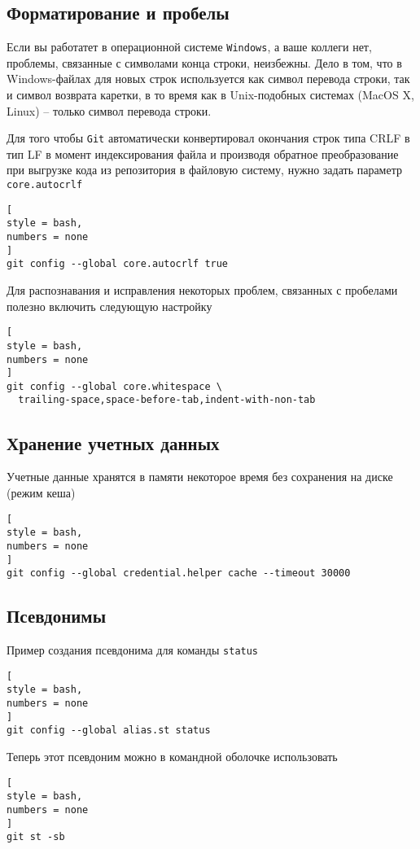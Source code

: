 \documentclass[%
	11pt,
	a4paper,
	utf8,
		]{article}
\begin{document}
\subsection{Форматирование и пробелы}

Если вы работатет в операционной системе \texttt{Windows}, а ваше коллеги нет, проблемы, связанные с символами конца строки, неизбежны. Дело в том, что в Windows-файлах для новых строк используется как символ перевода строки, так и символ возврата каретки, в то время как в Unix-подобных системах (MacOS X, Linux) -- только символ перевода строки.

Для того чтобы \texttt{Git} автоматически конвертировал окончания строк типа CRLF в тип LF в момент индексирования файла и производя обратное преобразование при выгрузке кода из репозитория в файловую систему, нужно задать параметр \texttt{core.autocrlf}
\begin{lstlisting}[
style = bash,
numbers = none
]
git config --global core.autocrlf true
\end{lstlisting}

Для распознавания и исправления некоторых проблем, связанных с пробелами полезно
включить следующую настройку
\begin{lstlisting}[
style = bash,
numbers = none
]
git config --global core.whitespace \
  trailing-space,space-before-tab,indent-with-non-tab
\end{lstlisting}


\subsection{Хранение учетных данных}

Учетные данные хранятся в памяти некоторое время без сохранения на диске (режим кеша)
\begin{lstlisting}[
style = bash,
numbers = none
]
git config --global credential.helper cache --timeout 30000
\end{lstlisting}

\subsection{Псевдонимы}

Пример создания псевдонима для команды \texttt{status}
\begin{lstlisting}[
style = bash,
numbers = none
]
git config --global alias.st status
\end{lstlisting}

Теперь этот псевдоним можно в командной оболочке использовать
\begin{lstlisting}[
style = bash,
numbers = none
]
git st -sb
\end{lstlisting}
\end{document}
